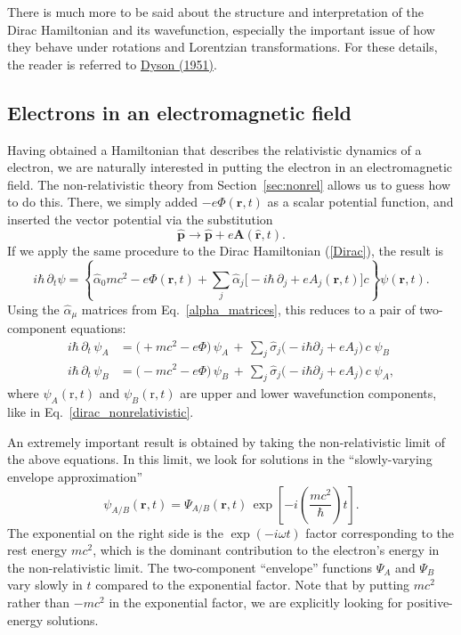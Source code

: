 \documentclass[pra,12pt]{revtex4}
\begin{document}
There is much more to be said about the structure and interpretation
of the Dirac Hamiltonian and its wavefunction, especially the
important issue of how they behave under rotations and Lorentzian
transformations.  For these details, the reader is referred to
\hyperref[cite:dyson]{Dyson (1951)}.

\subsection{Electrons in an electromagnetic field}
\label{sec:diracem}

Having obtained a Hamiltonian that describes the relativistic dynamics
of a electron, we are naturally interested in putting the electron in
an electromagnetic field.  The non-relativistic theory from
Section~\ref{sec:nonrel} allows us to guess how to do this.  There, we
simply added $-e\Phi(\mathbf{r},t)$ as a scalar potential function,
and inserted the vector potential via the substitution
\begin{equation}
  \hat{\mathbf{p}} \rightarrow \hat{\mathbf{p}}
  + e\mathbf{A}(\hat{\mathbf{r}},t).  
\end{equation}
If we apply the same procedure to the Dirac Hamiltonian (\ref{Dirac}),
the result is
\begin{equation}
  i\hbar \, \partial_t \psi
  = \left\{\hat{\alpha}_0 mc^2 -e\Phi(\mathbf{r},t)
  + \sum_{j} \hat{\alpha}_j \Big[-i\hbar\,\partial_j
    +eA_j(\mathbf{r},t) \Big] c\right\}\psi(\mathbf{r},t).
\end{equation}
Using the $\hat{\alpha}_\mu$ matrices from Eq.~\eqref{alpha_matrices},
this reduces to a pair of two-component equations:
\begin{align}
  i\hbar\, \partial_t \, \psi_A
  &= \big(+mc^2 -e\Phi \big)\,
  \psi_A
  \,+\, \sum_{j} \hat{\sigma}_j \big(-i\hbar\partial_j
    +eA_j \big) \,c\;\psi_B \label{Dirac2a} \\
  i\hbar\, \partial_t \, \psi_B
  &= \big(- mc^2 -e\Phi\big)\,
  \psi_B \,+\, \sum_{j} \hat{\sigma}_j \big(-i\hbar\partial_j
    +eA_j \big)\, c\;\psi_A, \label{Dirac2b}
\end{align}
where $\psi_A(\mathrm{r},t)$ and $\psi_B(\mathrm{r},t)$ are upper and
lower wavefunction components, like in
Eq.~\eqref{dirac_nonrelativistic}.

An extremely important result is obtained by taking the
non-relativistic limit of the above equations.  In this limit, we look
for solutions in the ``slowly-varying envelope approximation''
\begin{equation}
  \psi_{A/B}(\mathbf{r},t) = \Psi_{A/B}(\mathbf{r},t)\,
  \exp\left[-i\left(\frac{mc^2}{\hbar}\right)t\right].
\end{equation}
The exponential on the right side is the $\exp(-i\omega t)$ factor
corresponding to the rest energy $mc^2$, which is the dominant
contribution to the electron's energy in the non-relativistic limit.
The two-component ``envelope'' functions $\Psi_A$ and $\Psi_B$ vary
slowly in $t$ compared to the exponential factor.  Note that by
putting $mc^2$ rather than $-mc^2$ in the exponential factor, we are
explicitly looking for positive-energy solutions.
\end{document}
